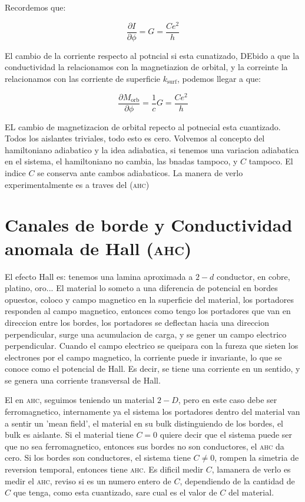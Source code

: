 \documentclass[11pt,fleqn]{book}
\begin{document}

Recordemos que:

\begin{equation}
     \frac{\partial I}{\partial \phi}=G=\frac{Ce^{2}}{h}
\end{equation}

El cambio de la corriente respecto al potncial si esta cunatizado, DEbido a que la conductividad la relacionamos con la magnetiazion de orbital, y la correinte la relacionamos con las corriente de superficie $k_{\text{surf}}$, podemos llegar a que:

\begin{equation}
    \frac{\partial M_{\text{orb}}}{\partial \phi}=\frac{1}{c}G=\frac{Ce^{2}}{h}
\end{equation}

EL cambio de magnetizacion de orbital repecto al potnecial esta cuantizado. Todos los aislantes triviales, todo esto es cero. Volvemos al concepto del hamiltoniano adiabatico y la idea adiabatica, si tenemos una variacion adiabatica en el sistema, el hamiltoniano no cambia, las bnadas tampoco, y $C$ tampoco. El indice $C$ se conserva ante cambos adiabaticos. La manera de verlo experimentalmente es a traves del (\textsc{ahc})

\section{Canales de borde y Conductividad anomala de Hall (\textsc{ahc})}

El efecto Hall es: tenemos una lamina aproximada a $2-d$ conductor, en cobre, platino, oro... El material lo someto a una diferencia de potencial en bordes opuestos, coloco y campo magnetico en la superficie del material, los portadores responden al campo magnetico, entonces como tengo los portadores que van en direccion entre los bordes, los portadores se deflectan hacia una direccion perpendicular, surge una acumulacion de carga, y se gener un campo electrico perpendicular. Cuando el campo electrico se queipara con la fureza que sieten los electrones por el campo magnetico, la corriente puede ir invariante, lo que se conoce como el potencial de Hall. Es decir, se tiene una corriente en un sentido, y se genera una corriente transversal de Hall. 

El en \textsc{ahc}, seguimos teniendo un material $2-D$, pero en este caso debe ser ferromagnetico, internamente ya el sistema los portadores dentro del material van a sentir un 'mean field', el material en su bulk distinguiendo de los bordes, el bulk es aislante. Si el material tiene $C=0$ quiere decir que el sistema puede ser que no sea ferromagnetico, entonces sus bordes no son conductores, el \textsc{ahc} da cero.  Si los bordes son conductores, el sistema tiene $C\neq0$, rompen la simetria de reversion temporal, entonces tiene \textsc{ahc}. Es dificil medir $C$, lamanera de verlo es medir el \textsc{ahc}, reviso si es un numero entero de $C$, dependiendo de la cantidad de $C$ que tenga, como esta cuantizado, sare cual es el valor de $C$ del material.
\end{document}
